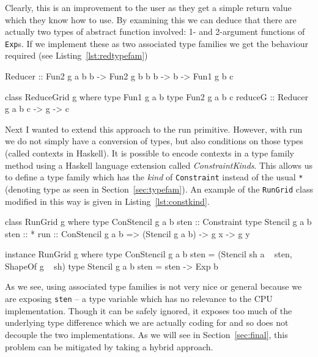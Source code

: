 \documentclass[12pt,a4paper,oneside]{scrbook}
\begin{document}
Clearly, this is an improvement to the user as they get a simple return value
which they know how to use. By examining this we can deduce that there are
actually two types of abstract function involved: 1- and 2-argument functions of
\texttt{Exp}s. If we implement these as two associated type families we get the
behaviour required (see Listing~\ref{lst:redtypefam})

\begin{hflisting}[label={lst:redtypefam}, caption={The application of type
    families to the reduce primitive.}]
Reducer :: Fun2 g a b b
        -> Fun2 g b b b
        -> b
        -> Fun1 g b c

class ReduceGrid g where
    type Fun1 g a b
    type Fun2 g a b c
    reduceG :: Reducer g a b c -> g -> c
\end{hflisting}

Next I wanted to extend this approach to the run primitive. However, with run we
do not simply have a conversion of types, but also conditions on those types
(called contexts in Haskell). It is possible to encode contexts in a type family
method using a Haskell language extension called \emph{ConstraintKinds}. This
allows us to define a type family which has the \emph{kind} of
\texttt{Constraint} instead of the usual \texttt{*} (denoting type as seen in
Section~\ref{sec:typefam}). An example of the \texttt{RunGrid} class modified in
this way is given in Listing~\ref{lst:constkind}.

\begin{hflisting}[label={lst:constkind}, caption={The application of type
    families to the run primitive.}]
class RunGrid g where
    type ConStencil g a b sten :: Constraint
    type Stencil g a b sten :: *
    run :: ConStencil g a b => (Stencil g a b) -> g x -> g y

instance RunGrid g where
    type ConStencil g a b sten = (Stencil sh a ~ sten, ShapeOf g ~ sh)
    type Stencil g a b sten = sten -> Exp b
\end{hflisting}

As we see, using associated type families is not very nice or general because we
are exposing \texttt{sten} -- a type variable which has no relevance to the CPU
implementation. Though it can be safely ignored, it exposes too much of the
underlying type difference which we are actually coding for and so does not
decouple the two implementations. As we will see in Section~\ref{sec:final},
this problem can be mitigated by taking a hybrid approach.
\end{document}
